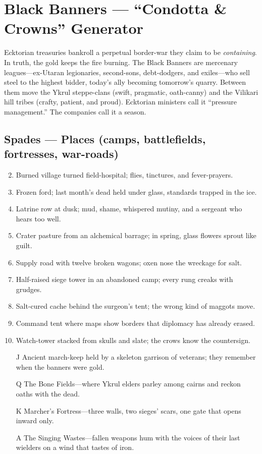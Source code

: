 \section{Black Banners --- ``Condotta \& Crowns'' Generator}
\label{chap:black-banners}

Ecktorian treasuries bankroll a perpetual border-war they claim to be \emph{containing}. In truth, the gold keeps the fire burning. The  Black Banners are mercenary leagues—ex-Utaran legionaries, second-sons, debt-dodgers, and exiles—who sell steel to the highest bidder, today’s ally becoming tomorrow’s quarry. Between them move the  Ykrul steppe-clans (swift, pragmatic, oath-canny) and the  Vilikari hill tribes (crafty, patient, and proud). Ecktorian ministers call it “pressure management.” The companies call it a season.

\subsection*{Spades --- Places (camps, battlefields, fortresses, war-roads)}
\label{sec:black-banners-places}
\begin{enumerate}
\setcounter{enumi}{1}
\item Burned village turned field-hospital; flies, tinctures, and fever-prayers.
\item Frozen ford; last month’s dead held under glass, standards trapped in the ice.
\item Latrine row at dusk; mud, shame, whispered mutiny, and a sergeant who hears too well.
\item Crater pasture from an alchemical barrage; in spring, glass flowers sprout like guilt.
\item Supply road with twelve broken wagons; oxen nose the wreckage for salt.
\item Half-raised siege tower in an abandoned camp; every rung creaks with grudges.
\item Salt-cured cache behind the surgeon’s tent; the wrong kind of maggots move.
\item Command tent where maps show borders that diplomacy has already erased.
\item Watch-tower stacked from skulls and slate; the crows know the countersign.
\item[J] Ancient march-keep held by a skeleton garrison of veterans; they remember when the banners were gold.
\item[Q] The Bone Fields—where Ykrul elders parley among cairns and reckon oaths with the dead.
\item[K] Marcher’s Fortress—three walls, two sieges’ scars, one gate that opens inward only.
\item[A] The Singing Wastes—fallen weapons hum with the voices of their last wielders on a wind that tastes of iron.
\end{enumerate}

